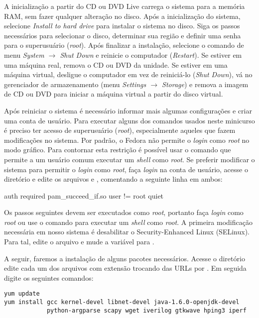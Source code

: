 A inicialização a partir do CD ou DVD Live carrega o sistema para a
memória RAM, sem fazer qualquer alteração no disco. Após a
inicialização do sistema, selecione \emph{Install to hard drive}
para instalar o sistema no disco.  Siga os passos necessários para
selecionar o disco, determinar sua região e definir uma senha para o
superusuário (\emph{root}). Após finalizar a instalação, selecione o
comando de menu \emph{System $\rightarrow$ Shut Down} e reinicie o
computador (\emph{Restart}). Se estiver em uma máquina real, remova
o CD ou DVD da unidade. Se estiver em uma máquina virtual, desligue
o computador em vez de reiniciá-lo (\emph{Shut Down}), vá no
gerenciador de armazenamento (menu \emph{Settings $\rightarrow$
Storage}) e remova a imagem de CD ou DVD para iniciar a máquina
virtual a partir do disco virtual.

Após reiniciar o sistema é necessário informar mais algumas
configurações e criar uma conta de usuário. Para executar alguns dos
comandos usados neste minicurso é preciso ter acesso de superusuário
(\emph{root}), especialmente aqueles que fazem modificações no
sistema.  Por padrão, o Fedora não permite o \emph{login} como
\emph{root} no modo gráfico. Para contornar esta restrição é
possível usar o comando  que permite a um usuário comum
executar um \emph{shell} como \emph{root}. Se preferir modificar o
sistema para permitir o \emph{login} como \emph{root}, faça
\emph{login} na conta de usuário, acesse o diretório
 e edite os arquivos  e
, comentando a seguinte linha em ambos:

\begin{verbnobox}[\small]
auth   required    pam_succeed_if.so user != root quiet
\end{verbnobox}

Os passos seguintes devem ser executados como \emph{root}, portanto
faça \emph{login} como \emph{root} ou use o comando  para
executar um \emph{shell} como \emph{root}.  A primeira modificação
necessária em nosso sistema é desabilitar o Security-Enhanced Linux
(SELinux). Para tal, edite o arquivo  e
mude a variável  para .

A seguir, faremos a instalação de alguns pacotes necessários. Acesse
o diretório  edite cada um dos arquivos com
extensão  trocando  das URLs por .
Em seguida digite os seguintes comandos:

\begin{verbatim}
yum update
yum install gcc kernel-devel libnet-devel java-1.6.0-openjdk-devel
            python-argparse scapy wget iverilog gtkwave hping3 iperf
\end{verbatim}

